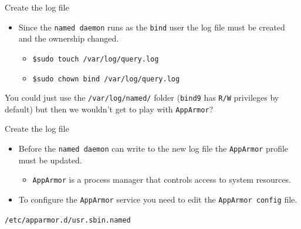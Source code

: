 \documentclass[xcolor=table]{beamer}
\begin{document}
\begin{frame}{Create the log file}
  \begin{itemize}
    \item Since the \texttt{named daemon} runs as the \texttt{bind} user the log file must be created and the ownership changed.
      \begin{itemize}
        \item \texttt{\$sudo touch /var/log/query.log }
        \item \texttt{\$sudo chown bind /var/log/query.log}
      \end{itemize}
  \end{itemize}
  \begin{tcolorbox}[title={\textbf{NOTE:}}]
      \begin{center}
        You could just use the \texttt{/var/log/named/} folder (\texttt{bind9} has \texttt{R/W} privileges by default) but then we wouldn't get to play with \texttt{AppArmor}?        
      \end{center}
  \end{tcolorbox}
\end{frame}

\begin{frame}{Create the log file}
  \begin{itemize}
    \item Before the \texttt{named daemon} can write to the new log file the \texttt{AppArmor} profile must be updated.
      \begin{itemize}
        \item \texttt{AppArmor} is a process manager that controls access to system resources.
      \end{itemize}
    \item To configure the \texttt{AppArmor} service you need to edit the \texttt{AppArmor config} file.
  \end{itemize}
  \begin{tcolorbox}
      \begin{center}
        \texttt{/etc/apparmor.d/usr.sbin.named}
      \end{center}
  \end{tcolorbox}
\end{frame}
\end{document}
